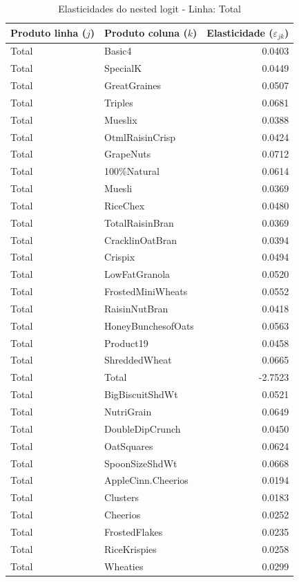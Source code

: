 \begingroup
\begin{table}[H]
\centering
\caption{Elasticidades do nested logit - Linha: Total}
\label{tab:elas-nested-total}
\small
\begin{tabular}{llr}
\toprule
Produto linha ($j$) & Produto coluna ($k$) & Elasticidade ($\varepsilon_{jk}$) \\
\midrule
Total & Basic4 & 0.0403 \\
Total & SpecialK & 0.0449 \\
Total & GreatGraines & 0.0507 \\
Total & Triples & 0.0681 \\
Total & Mueslix & 0.0388 \\
Total & OtmlRaisinCrisp & 0.0424 \\
Total & GrapeNuts & 0.0712 \\
Total & 100\%Natural & 0.0614 \\
Total & Muesli & 0.0369 \\
Total & RiceChex & 0.0480 \\
Total & TotalRaisinBran & 0.0369 \\
Total & CracklinOatBran & 0.0394 \\
Total & Crispix & 0.0494 \\
Total & LowFatGranola & 0.0520 \\
Total & FrostedMiniWheats & 0.0552 \\
Total & RaisinNutBran & 0.0418 \\
Total & HoneyBunchesofOats & 0.0563 \\
Total & Product19 & 0.0458 \\
Total & ShreddedWheat & 0.0665 \\
Total & Total & -2.7523 \\
Total & BigBiscuitShdWt & 0.0521 \\
Total & NutriGrain & 0.0649 \\
Total & DoubleDipCrunch & 0.0450 \\
Total & OatSquares & 0.0624 \\
Total & SpoonSizeShdWt & 0.0668 \\
Total & AppleCinn.Cheerios & 0.0194 \\
Total & Clusters & 0.0183 \\
Total & Cheerios & 0.0252 \\
Total & FrostedFlakes & 0.0235 \\
Total & RiceKrispies & 0.0258 \\
Total & Wheaties & 0.0299 \\

\end{tabular}
\end{table}

